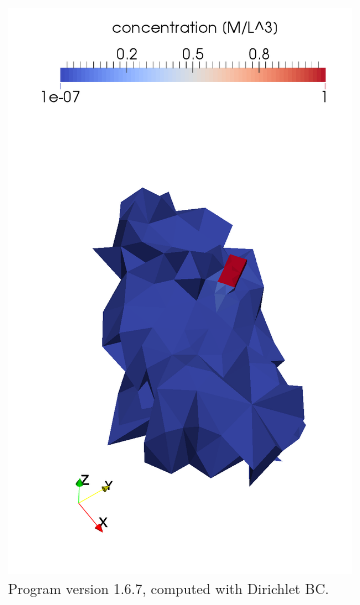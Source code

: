 \begin{figure}[!h]
    \centering
    \begin{subfigure}[b]{0.3\textwidth}
        \centering
        \includegraphics[width=\textwidth]{tests_graphics/mel_transport_end_167o.pdf}
        \caption{Program version 1.6.7, computed with Dirichlet BC.}
        \label{fig:bench_mel3a}
    \end{subfigure}
    ~
    \begin{subfigure}[b]{0.3\textwidth}
        \centering

\end{subfigure}
\end{figure}
